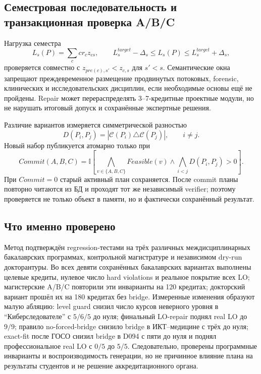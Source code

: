 \documentclass[twoside,11pt]{article}
\begin{document}
\subsection{Семестровая последовательность и транзакционная проверка A/B/C}

Нагрузка семестра
\begin{equation}
L_s(P)=\sum_c cr_c z_{cs},\qquad
L_s^{target}-\Delta_s\le L_s(P)\le L_s^{target}+\Delta_s,
\label{eq:semester-load-new}
\end{equation}
проверяется совместно с $z_{pre(c),s'}<z_{c,s}$ для $s'<s$. Семантические
окна запрещают преждевременное размещение продвинутых потоковых, forensic,
клинических и исследовательских дисциплин, если необходимые основы ещё не
пройдены. Repair может перераспределять 3--7-кредитные проектные модули, но не
нарушать итоговый допуск и сохранённые экспертные решения.

Различие вариантов измеряется симметрической разностью
\begin{equation}
D(P_i,P_j)=|\mathcal{C}(P_i)\triangle\mathcal{C}(P_j)|,
\qquad i\ne j.
\label{eq:variant-diversity}
\end{equation}
Новый набор публикуется атомарно только при
\begin{equation}
Commit(A,B,C)=\mathbb{I}\left[
\bigwedge_{v\in\{A,B,C\}} Feasible(v)\land
\bigwedge_{i<j}D(P_i,P_j)>0\right].
\label{eq:transactional-commit}
\end{equation}
При $Commit=0$ старый активный план сохраняется. После commit планы повторно
читаются из БД и проходят тот же независимый verifier; поэтому проверяется не
только объект в памяти, но и фактически сохранённый результат.

\subsection{Что именно проверено}

Метод подтверждён regression-тестами на трёх различных междисциплинарных
бакалаврских программах, контрольной магистратуре и независимом dry-run
докторантуры. Во всех девяти сохранённых бакалаврских вариантах выполнены
целевые кредиты, нулевое число hard violations и реальное покрытие всех LO;
магистерские A/B/C повторили эти инварианты на 120 кредитах; докторский вариант
прошёл их на 180 кредитах без bridge. Измеренные изменения образуют малую
абляцию: level guard снизил число курсов неверного уровня в
``Киберследователе'' с $5/6/5$ до нуля; финальный LO-repair поднял real LO до
$9/9$; правило no-forced-bridge снизило bridge в ИКТ--медицине с трёх до нуля;
exact-fit после ГОСО снизил bridge в D094 с пяти до нуля и поднял
профессиональное real LO с $0/5$ до $5/5$. Следовательно, проверены программные
инварианты и воспроизводимость генерации, но не причинное влияние плана на
результаты студентов и не решение аккредитационного органа.
\end{document}
